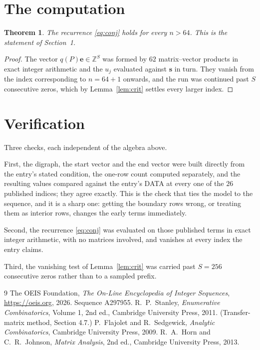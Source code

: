 \documentclass[11pt,a4paper]{article}
\theoremstyle{plain}
\newtheorem{theorem}{Theorem}
\theoremstyle{definition}
\begin{document}
\section{The computation}

\begin{theorem}
The recurrence \eqref{eq:conj} holds for every $n>64$. This is the statement of
Section~1.
\end{theorem}

\begin{proof}
The vector $q(P)\mathbf{e}\in\mathbb{Z}^{S}$ was formed by $62$ matrix--vector
products in exact integer arithmetic and the $u_j$ evaluated against $\mathbf{s}$ in turn.
They vanish from the index corresponding to $n=64+1$ onwards, and the run was continued
past $S$ consecutive zeros, which by Lemma~\ref{lem:crit} settles every larger index.
\end{proof}

\section{Verification}

Three checks, each independent of the algebra above.

First, the digraph, the start vector and the end vector were built directly from the
entry's stated condition, the one-row count computed separately, and the resulting values
compared against the entry's DATA at every one of the $26$ published indices; they
agree exactly. This is the check that ties the model to the sequence, and it is a sharp one:
getting the boundary rows wrong, or treating them as interior rows, changes the early terms
immediately.

Second, the recurrence \eqref{eq:conj} was evaluated on those published terms in exact
integer arithmetic, with no matrices involved, and vanishes at every index the entry claims.

Third, the vanishing test of Lemma~\ref{lem:crit} was carried past $S=256$ consecutive
zeros rather than to a sampled prefix.

\begin{thebibliography}{9}
 The OEIS Foundation, \emph{The On-Line Encyclopedia of Integer
Sequences}, \url{https://oeis.org}, 2026. Sequence A297955.
 R.~P.~Stanley, \emph{Enumerative Combinatorics}, Volume 1, 2nd ed.,
Cambridge University Press, 2011. (Transfer-matrix method, Section 4.7.)
 P.~Flajolet and R.~Sedgewick, \emph{Analytic Combinatorics}, Cambridge
University Press, 2009.
 R.~A.~Horn and C.~R.~Johnson, \emph{Matrix Analysis}, 2nd ed., Cambridge
University Press, 2013.
\end{thebibliography}
\end{document}
